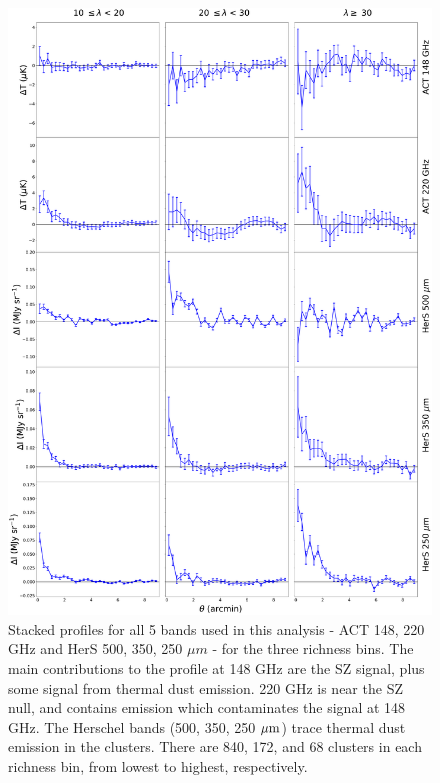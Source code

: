 \documentclass[a4paper,fleqn,usenatbib]{mnras}
\begin{document}
\begin{figure}
  \centering
  \includegraphics[height=0.9 \textheight]{5panel_rawprofs_all_stacks_all_rbin.pdf}

\caption{Stacked profiles for all 5 bands used in this analysis - ACT 148, 220 GHz and HerS 500, 350, 250 $\mu m$ - for the three richness bins. The main contributions to the profile at 148 GHz are the SZ signal, plus some signal from thermal dust emission. 220 GHz is near the SZ null, and contains emission which contaminates the signal at 148 GHz. The Herschel bands (500, 350, 250 $\rm \mu m$) trace thermal dust emission in the clusters. There are 840, 172, and 68 clusters in each richness bin, from lowest to highest, respectively.}  
  \label{fig:rawstacks}
\end{figure}
\end{document}
